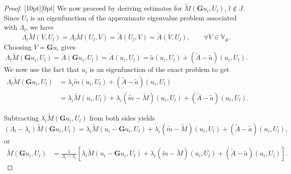\documentclass{siamart0516}
\newcommand{\bG}{\ensuremath{\boldsymbol G}}
\newcommand{\step}[1]{\noindent\raisebox{1.5pt}[10pt][0pt]{\tiny\framebox{$#1$}}\xspace}
\numberwithin{equation}{section}
\numberwithin{theorem}{section}
\numberwithin{figure}{section}
\begin{document}
\begin{proof}
\step{2} We now proceed by deriving estimates for $\widetilde M\left(\bG u_i, U_{l}\right)$, $l \not \in J$.
Since $U_{l}$ is an eigenfunction of the approximate eigenvalue problem associated with $\Lambda_l$, we have
$$
\Lambda_{l}\widetilde M(V, U_{l}) = \Lambda_l \widetilde M(U_l,V) = \widetilde A(U_l,V) = \widetilde A(V,U_l) ,\qquad \forall V\in\mathbb V_\#. 
$$
Choosing $V = \bG u_i$  gives
$$
\Lambda_{l}\widetilde M(\bG u_i, U_{l}) = \widetilde A(\bG u_i, U_{l}) 
= \widetilde A (u_i,U_{l}) = \tilde a(u_i,U_{l}) + (\widetilde A-\tilde a)(u_i,U_{l}).
$$
We now use the fact that $u_i$ is an eigenfunction of the exact problem to get
\begin{align*}
\Lambda_{l}\widetilde M(\bG u_i, U_{l})  &= \lambda_i \tilde m(u_i,U_{l}) + (\widetilde A-\tilde a)(u_i,U_{l}) \\
& = \lambda_i\widetilde M(u_i,U_{l}) + \lambda_i (\tilde m-\widetilde M)(u_i,U_{l}) + (\widetilde A-\tilde a)(u_i,U_{l}).
\end{align*}

Subtracting $\lambda_i\widetilde M(\bG u_i,U_{l})$ from both sides yields
$$
(\Lambda_{l}-\lambda_i)\widetilde M(\bG u_i, U_{l}) = \lambda_i\widetilde M(u_i-\bG u_i,U_{l}) + \lambda_i (\tilde m-\widetilde M)(u_i,U_{l}) + (\widetilde A-\tilde a)(u_i,U_{l}),
$$
or
\begin{align*}
\widetilde M(\bG u_i, U_{l}) &= \frac{1}{\Lambda_{l}-\lambda_i}\left [ \lambda_i \widetilde M(u_i-\bG u_i,U_{l}) + \lambda_i (\tilde m-\widetilde M)(u_i,U_{l}) + (\widetilde A-\tilde a)(u_i,U_{l}) \right].
\end{align*}


\end{proof}
\end{document}
